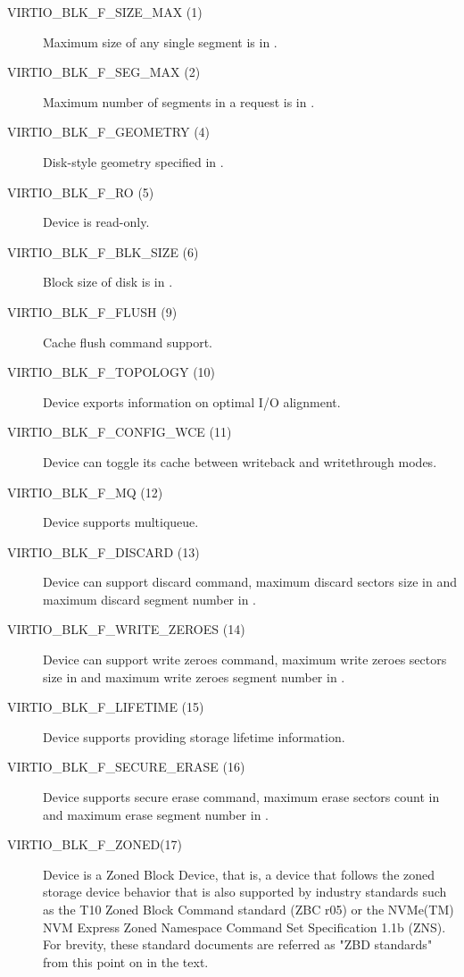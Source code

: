 \begin{description}
\item[VIRTIO_BLK_F_SIZE_MAX (1)] Maximum size of any single segment is
    in .

\item[VIRTIO_BLK_F_SEG_MAX (2)] Maximum number of segments in a
    request is in .

\item[VIRTIO_BLK_F_GEOMETRY (4)] Disk-style geometry specified in
    .

\item[VIRTIO_BLK_F_RO (5)] Device is read-only.

\item[VIRTIO_BLK_F_BLK_SIZE (6)] Block size of disk is in .

\item[VIRTIO_BLK_F_FLUSH (9)] Cache flush command support.

\item[VIRTIO_BLK_F_TOPOLOGY (10)] Device exports information on optimal I/O
    alignment.

\item[VIRTIO_BLK_F_CONFIG_WCE (11)] Device can toggle its cache between writeback
    and writethrough modes.

\item[VIRTIO_BLK_F_MQ (12)] Device supports multiqueue.

\item[VIRTIO_BLK_F_DISCARD (13)] Device can support discard command, maximum
    discard sectors size in  and maximum discard
    segment number in .

\item[VIRTIO_BLK_F_WRITE_ZEROES (14)] Device can support write zeroes command,
     maximum write zeroes sectors size in  and
     maximum write zeroes segment number in .

\item[VIRTIO_BLK_F_LIFETIME (15)] Device supports providing storage lifetime
     information.

\item[VIRTIO_BLK_F_SECURE_ERASE (16)] Device supports secure erase command,
     maximum erase sectors count in  and
     maximum erase segment number in .

\item[VIRTIO_BLK_F_ZONED(17)] Device is a Zoned Block Device, that is, a device
	that follows the zoned storage device behavior that is also supported by
	industry standards such as the T10 Zoned Block Command standard (ZBC r05) or
	the NVMe(TM) NVM Express Zoned Namespace Command Set Specification 1.1b
	(ZNS). For brevity, these standard documents are referred as "ZBD standards"
	from this point on in the text.

\end{description}

